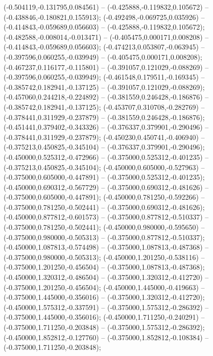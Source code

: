  (-0.504119,-0.131795,0.084561) -- (-0.425888,-0.119832,0.105672) -- (-0.438846,-0.180821,0.155913);
 (-0.492498,-0.069725,0.035926) -- (-0.414843,-0.059689,0.056603) -- (-0.425888,-0.119832,0.105672);
 (-0.482588,-0.008014,-0.013471) -- (-0.405475,0.000171,0.008208) -- (-0.414843,-0.059689,0.056603);
 (-0.474213,0.053807,-0.063945) -- (-0.397596,0.060255,-0.039949) -- (-0.405475,0.000171,0.008208);
 (-0.467237,0.116177,-0.115801) -- (-0.391057,0.121029,-0.088269) -- (-0.397596,0.060255,-0.039949);
 (-0.461548,0.179511,-0.169345) -- (-0.385742,0.182941,-0.137125) -- (-0.391057,0.121029,-0.088269);
 (-0.457060,0.244218,-0.224892) -- (-0.381559,0.246428,-0.186876) -- (-0.385742,0.182941,-0.137125);
 (-0.453707,0.310708,-0.282769) -- (-0.378441,0.311929,-0.237879) -- (-0.381559,0.246428,-0.186876);
 (-0.451441,0.379402,-0.343326) -- (-0.376337,0.379901,-0.290496) -- (-0.378441,0.311929,-0.237879);
 (-0.450230,0.450741,-0.406940) -- (-0.375213,0.450825,-0.345104) -- (-0.376337,0.379901,-0.290496);
 (-0.450000,0.525312,-0.472966) -- (-0.375000,0.525312,-0.401235) -- (-0.375213,0.450825,-0.345104);
 (-0.450000,0.605000,-0.527963) -- (-0.375000,0.605000,-0.447891) -- (-0.375000,0.525312,-0.401235);
 (-0.450000,0.690312,-0.567729) -- (-0.375000,0.690312,-0.481626) -- (-0.375000,0.605000,-0.447891);
 (-0.450000,0.781250,-0.592266) -- (-0.375000,0.781250,-0.502441) -- (-0.375000,0.690312,-0.481626);
 (-0.450000,0.877812,-0.601573) -- (-0.375000,0.877812,-0.510337) -- (-0.375000,0.781250,-0.502441);
 (-0.450000,0.980000,-0.595650) -- (-0.375000,0.980000,-0.505313) -- (-0.375000,0.877812,-0.510337);
 (-0.450000,1.087813,-0.574498) -- (-0.375000,1.087813,-0.487368) -- (-0.375000,0.980000,-0.505313);
 (-0.450000,1.201250,-0.538116) -- (-0.375000,1.201250,-0.456504) -- (-0.375000,1.087813,-0.487368);
 (-0.450000,1.320312,-0.486504) -- (-0.375000,1.320312,-0.412720) -- (-0.375000,1.201250,-0.456504);
 (-0.450000,1.445000,-0.419663) -- (-0.375000,1.445000,-0.356016) -- (-0.375000,1.320312,-0.412720);
 (-0.450000,1.575312,-0.337591) -- (-0.375000,1.575312,-0.286392) -- (-0.375000,1.445000,-0.356016);
 (-0.450000,1.711250,-0.240291) -- (-0.375000,1.711250,-0.203848) -- (-0.375000,1.575312,-0.286392);
 (-0.450000,1.852812,-0.127760) -- (-0.375000,1.852812,-0.108384) -- (-0.375000,1.711250,-0.203848);
